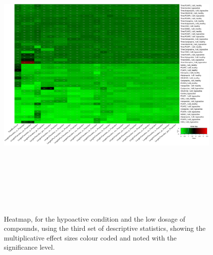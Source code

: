 \documentclass[a4paper,12pt]{article}
\begin{document}
\begin{figure}[h!]
\begin{center}
\includegraphics[width=16cm,height=15cm]{DarkApoLow_heatmap_1_microM_DarkApoLow_B1MAP.png}
\caption{Heatmap, for the hypoactive condition and the low dosage of compounds, using the third set of descriptive statistics, showing the multiplicative effect sizes colour coded and noted with the significance level.}
\end{center}
\end{figure}
\newpage
\end{document}
